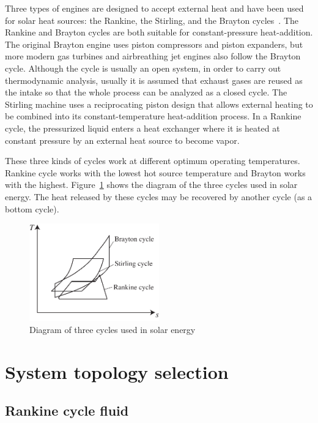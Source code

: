Three types of engines are designed to accept external heat and have been used for solar heat sources: the Rankine, the Stirling, and the Brayton cycles~\cite{Roschke1979}. The Rankine and Brayton cycles are both suitable for constant-pressure heat-addition. 
The original Brayton engine uses piston compressors and piston expanders, but more modern gas turbines and airbreathing jet engines also follow the Brayton cycle. Although the cycle is usually an open system, in order to carry out thermodynamic analysis, usually it is assumed that exhaust gases are reused as the intake so that the whole process can be analyzed as a closed cycle.
The Stirling machine uses a reciprocating piston design that allows external heating to be combined into its constant-temperature heat-addition process. 
In a Rankine cycle, the pressurized liquid enters a heat exchanger where it is heated at constant pressure by an external heat source to become vapor.

These three kinds of cycles work at different optimum operating temperatures. Rankine cycle works with the lowest hot source temperature and Brayton works with the highest. Figure~\ref{fig:cycles} shows the diagram of the three cycles used in solar energy. The heat released by these cycles may be recovered by another cycle (as a bottom cycle).

\begin{figure}[h]
\centering 
\includegraphics[width=0.5\textwidth]{fig/cycles}
\caption{Diagram of three cycles used in solar energy}\label{fig:cycles}
\end{figure}

\section{System topology selection}
\label{sec:sts}
\subsection{Rankine cycle fluid}

